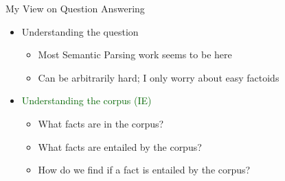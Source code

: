 
\begin{frame}{My View on Question Answering}
\begin{itemize}
  \itemsep 1em
  \item Understanding the question
  \begin{itemize}
    \itemsep 1em
    \item<2-> Most Semantic Parsing work seems to be here
    \item<2-> Can be arbitrarily hard; I only worry about easy factoids
  \end{itemize}

  \item \textcolor<3->{darkgreen}{Understanding the corpus (IE)}
  \begin{itemize}
    \itemsep 1em
    \item<4-> What facts are in the corpus? 
      \cite{key:2014angeli-kbp,key:2014angeli-active}
    \item<5-> What facts are entailed by the corpus? 
    \item<6-> How do we find if a fact is entailed by the corpus?
      \cite{key:2013angeli-truth,key:2014angeli-naturalli}
  \end{itemize}
\end{itemize}
\end{frame}

